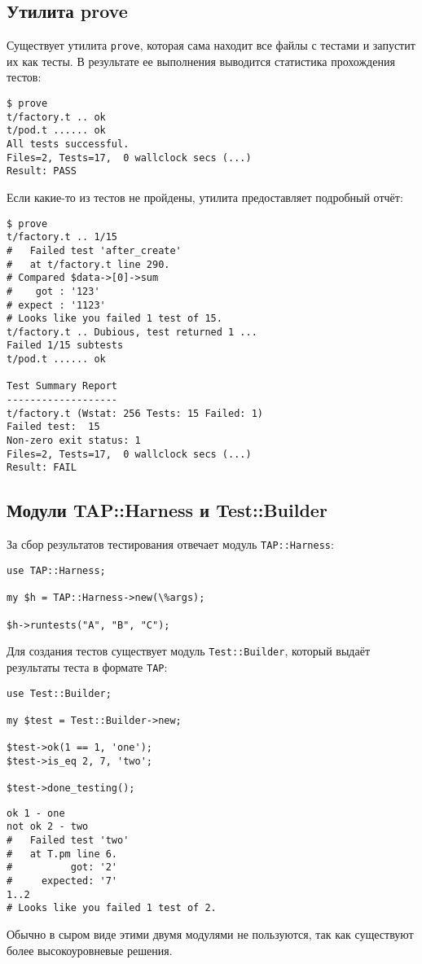 \subsection{Утилита prove}
Существует утилита \verb|prove|, которая сама находит все файлы с тестами и запустит их как тесты. В результате ее выполнения выводится статистика прохождения тестов:
\begin{verbatim}
$ prove
t/factory.t .. ok
t/pod.t ...... ok
All tests successful.
Files=2, Tests=17,  0 wallclock secs (...)
Result: PASS
\end{verbatim}
Если какие-то из тестов не пройдены, утилита предоставляет подробный отчёт:
\begin{verbatim}
$ prove
t/factory.t .. 1/15
#   Failed test 'after_create'
#   at t/factory.t line 290.
# Compared $data->[0]->sum
#    got : '123'
# expect : '1123'
# Looks like you failed 1 test of 15.
t/factory.t .. Dubious, test returned 1 ...
Failed 1/15 subtests
t/pod.t ...... ok

Test Summary Report
-------------------
t/factory.t (Wstat: 256 Tests: 15 Failed: 1)
Failed test:  15
Non-zero exit status: 1
Files=2, Tests=17,  0 wallclock secs (...)
Result: FAIL
\end{verbatim}

\subsection{Модули TAP::Harness и Test::Builder}
За сбор результатов тестирования отвечает модуль \verb|TAP::Harness|:
\begin{verbatim}
use TAP::Harness;

my $h = TAP::Harness->new(\%args);

$h->runtests("A", "B", "C");
\end{verbatim}
Для создания тестов существует модуль \verb|Test::Builder|, который выдаёт результаты теста в формате \verb|TAP|:
\begin{verbatim}
use Test::Builder;

my $test = Test::Builder->new;

$test->ok(1 == 1, 'one');
$test->is_eq 2, 7, 'two';

$test->done_testing();
\end{verbatim}
\begin{verbatim}
ok 1 - one
not ok 2 - two
#   Failed test 'two'
#   at T.pm line 6.
#          got: '2'
#     expected: '7'
1..2
# Looks like you failed 1 test of 2.
\end{verbatim}
Обычно в сыром виде этими двумя модулями не пользуются, так как существуют более высокоуровневые решения.

